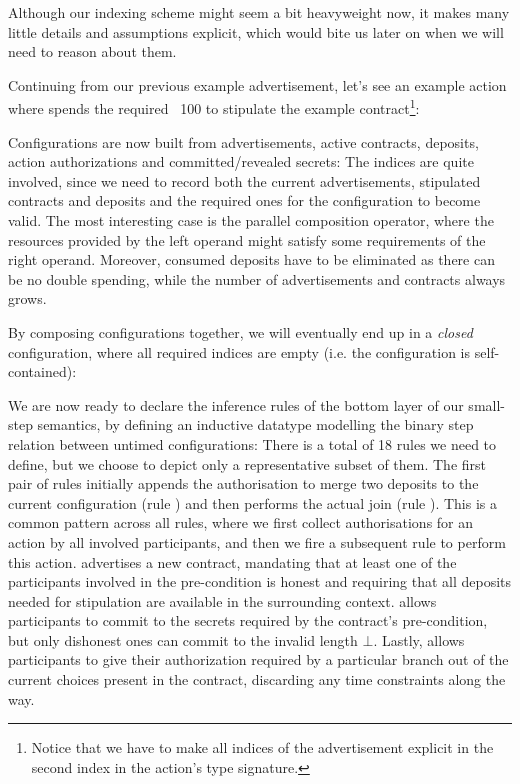 \documentclass[acmsmall,nonacm=true,screen=true]{acmart}
\begin{document}
Although our indexing scheme might seem a bit heavyweight now, it makes many little details and assumptions explicit,
which would bite us later on when we will need to reason about them.

Continuing from our previous example advertisement, let's see an example action where \inlineA{} spends the required \bitcoin ~100
to stipulate the example contract\footnote{
Notice that we have to make all indices of the advertisement explicit in the second index in the action's type signature.
}:
\BITactionExample{}

Configurations are now built from advertisements, active contracts, deposits, action authorizations and committed/revealed secrets:
\BITconfigurations{}
The indices are quite involved, since we need to record both the current advertisements, stipulated contracts and deposits
and the required ones for the configuration to become valid. The most interesting case is the parallel composition
operator, where the resources provided by the left operand might satisfy some requirements of the right operand. Moreover,
consumed deposits have to be eliminated as there can be no double spending, while the number of advertisements and contracts
always grows.

By composing configurations together, we will eventually end up in a \textit{closed} configuration, where 
all required indices are empty (i.e. the configuration is self-contained):
\BITclosedConfigurations{}

We are now ready to declare the inference rules of the bottom layer of our small-step semantics,
by defining an inductive datatype modelling the binary step relation between untimed configurations:
\BITrules{}
There is a total of 18 rules we need to define, but we choose to depict only a representative subset of them.
The first pair of rules initially appends the authorisation to merge
two deposits to the current configuration (rule \inlineAuthJoinRule{}) and then performs the actual join (rule \inlineJoinRule{}).
This is a common pattern across all rules, where we first collect authorisations for an action by all involved participants,
and then we fire a subsequent rule to perform this action.
\inlineAdvertiseRule{} advertises a new contract, mandating that at least one of the participants involved in the pre-condition
is honest and requiring that all deposits needed for stipulation are available in the surrounding context.
\inlineAuthCommitRule{} allows participants to commit to the secrets required by the contract's pre-condition, but only dishonest
ones can commit to the invalid length $\bot$.
Lastly, \inlineControlRule{} allows participants to give their authorization required by a particular branch out of the current
choices present in the contract, discarding any time constraints along the way.
\end{document}
